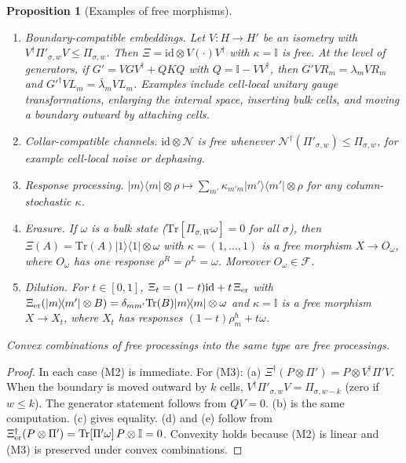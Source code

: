 \documentclass[11pt]{article}
\newtheorem{proposition}[theorem]{Proposition}
\theoremstyle{definition}
\theoremstyle{remark}
\newcommand{\Tr}{\mathrm{Tr}}
\newcommand{\one}{\mathbb{I}}
\newcommand{\ket}[1]{|#1\rangle}
\newcommand{\bra}[1]{\langle #1|}
\newcommand{\proj}[1]{|#1\rangle\!\langle #1|}
\newcommand{\Free}{\mathcal{F}}
\begin{document}
\begin{proposition}[Examples of free morphisms]\label{prop:examples}
\begin{enumerate}
\item[(a)] \emph{Boundary-compatible embeddings.} Let $V:H\to H'$ be an isometry with $V^\dagger\Pi'_{\sigma,w}V\le\Pi_{\sigma,w}$. Then $\Xi=\mathrm{id}\otimes V(\cdot)V^\dagger$ with $\kappa=\one$ is free. At the level of generators, if $G'=VGV^\dagger+QKQ$ with $Q=\one-VV^\dagger$, then $G'VR_m=\lambda_mVR_m$ and $G'^\dagger VL_m=\bar\lambda_mVL_m$. Examples include cell-local unitary gauge transformations, enlarging the internal space, inserting bulk cells, and moving a boundary outward by attaching cells.
\item[(b)] \emph{Collar-compatible channels.} $\mathrm{id}\otimes\mathcal N$ is free whenever $\mathcal N^\dagger(\Pi'_{\sigma,w})\le\Pi_{\sigma,w}$, for example cell-local noise or dephasing.
\item[(c)] \emph{Response processing.} $\ket m\!\bra{m}\otimes\rho\mapsto\sum_{m'}\kappa_{m'm}\proj{m'}\otimes\rho$ for any column-stochastic $\kappa$.
\item[(d)] \emph{Erasure.} If $\omega$ is a bulk state ($\Tr[\Pi_{\sigma,W}\omega]=0$ for all $\sigma$), then $\Xi(A)=\Tr(A)\proj1\otimes\omega$ with $\kappa=(1,\dots,1)$ is a free morphism $X\to O_\omega$, where $O_\omega$ has one response $\rho^R=\rho^L=\omega$. Moreover $O_\omega\in\Free$.
\item[(e)] \emph{Dilution.} For $t\in[0,1]$, $\Xi_t=(1-t)\mathrm{id}+t\,\Xi_{\rm er}$ with $\Xi_{\rm er}(\ket m\!\bra{m'}\otimes B)=\delta_{mm'}\Tr(B)\proj m\otimes\omega$ and $\kappa=\one$ is a free morphism $X\to X_t$, where $X_t$ has responses $(1-t)\rho^h_m+t\omega$.
\end{enumerate}
Convex combinations of free processings into the same type are free processings.
\end{proposition}
\begin{proof}
In each case (M2) is immediate. For (M3): (a) $\Xi^\dagger(P\otimes\Pi')=P\otimes V^\dagger\Pi'V$. When the boundary is moved outward by $k$ cells, $V^\dagger\Pi'_{\sigma,w}V=\Pi_{\sigma,w-k}$ (zero if $w\le k$). The generator statement follows from $QV=0$. (b) is the same computation. (c) gives equality. (d) and (e) follow from $\Xi_{\rm er}^\dagger(P\otimes\Pi')=\Tr[\Pi'\omega]\,P\otimes\one=0$. Convexity holds because (M2) is linear and (M3) is preserved under convex combinations.
\end{proof}
\end{document}
